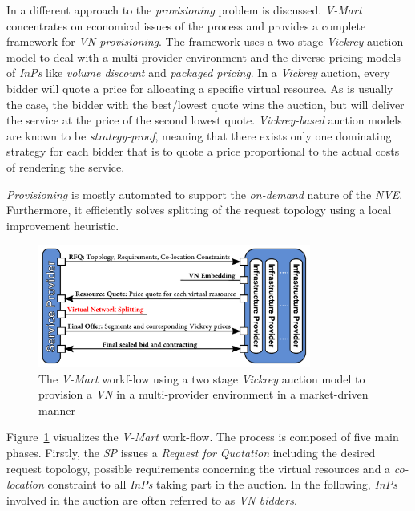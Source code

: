 \documentclass[prodmode,acmtomccap]{acmlarge}
\begin{document}
In  a different approach to the \emph{provisioning} problem is discussed. \emph{V-Mart} concentrates on economical issues of the 
process and provides a complete framework for \emph{VN provisioning}.
The framework uses a two-stage \emph{Vickrey} auction model to deal with a multi-provider environment and the diverse pricing models of \emph{InPs} like 
\emph{volume discount} and \emph{packaged pricing}. In a \emph{Vickrey} auction, every bidder will quote a price for allocating a specific virtual resource. As is usually the case, 
the bidder with the best/lowest quote wins the auction, but will deliver the service at the price of the second lowest quote. \emph{Vickrey-based} auction models are known to be \emph{strategy-proof},
meaning that there exists only one dominating strategy for each bidder that is to quote a price proportional to the actual costs of rendering the service.

\emph{Provisioning} is mostly automated to support the \emph{on-demand} nature of the \emph{NVE}. Furthermore, it
efficiently solves splitting of the request topology using a local improvement heuristic.

\begin{figure}[htb]
	\centering
	\includegraphics[width=0.8\textwidth]{vmart}
	\caption{The \emph{V-Mart} workf-low using a two stage \emph{Vickrey} auction model to provision a \emph{VN} in a multi-provider environment in a market-driven manner}
	\label{fig7}
\end{figure}

Figure~\ref{fig7} visualizes the \emph{V-Mart} work-flow. The process is composed of five main phases. 
Firstly, the \emph{SP} issues a \emph{Request for Quotation} including the desired request
topology, possible requirements concerning the virtual resources and a \emph{co-location} constraint to all \emph{InPs} taking part in the auction. In the following, \emph{InPs} involved in the auction
are often referred to as \emph{VN bidders}.
\end{document}
